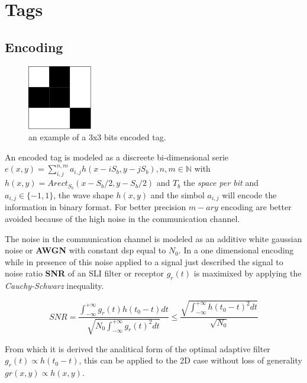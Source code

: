 \documentclass[a4paper]{report}
\begin{document}
\newpage 

\section{Tags}

\subsection{Encoding}

\begin{figure}
    \centering
    \includegraphics[width=0.25\textwidth]{reader.png}
    \caption{an example of a 3x3 bits encoded tag.}
\end{figure}

An encoded tag is modeled as a discreete bi-dimensional serie
$ e(x,y) = \sum_{i,j}^{n,m} a_{i,j} h(x-iS_{b},y-jS_{b}), n,m \in \mathbb{N}$ with $h(x,y) = Arect_{S_b}(x-S_b/2,y-S_b/2)$ and $T_b$ the \textit{space per bit} and $a_{i,j} \in \{ -1,1 \}$, the wave shape $h(x,y)$ and the simbol $a_{i,j}$ will encode the information in binary format. For better precision $m-ary$ encoding are better avoided because of the high noise in the communication channel.

The noise in the communication channel is modeled as an additive white gaussian noise or \textbf{AWGN} with constant dsp equal to $N_0$. In a one dimensional encoding while in presence of this noise applied to a signal just described the signal to noise ratio \textbf{SNR}  of an SLI filter or receptor $g_r(t)$ is maximixed by applying the \textit{Cauchy-Schwarz} inequality.

$$ SNR = \frac{\int_{-\infty}^{+\infty}g_r(t)h(t_0-t) dt}{\sqrt{N_0\int_{-\infty}^{+\infty}g_r(t)^2 dt}} \leq \frac{\sqrt{\int_{-\infty}^{+\infty}h(t_0-t)^2 dt}}{\sqrt{N_0}}$$

From which it is derived the analitical form of the optimal adaptive filter $g_r(t) \propto h(t_0 - t)$, this can be applied to the 2D case without loss of generality $gr(x,y) \propto h(x,y)$. 
\end{document}
